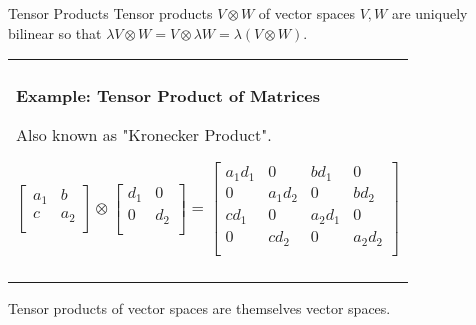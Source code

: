 \documentclass[11pt]{beamer}
\newenvironment{boxed2}
    {\begin{center}
    \begin{tabular}{|p{0.95\textwidth}|}
    \hline\\
    }
    { 
    \\\\\hline
    \end{tabular} 
    \end{center}
    }
\begin{document}
\begin{frame}{Tensor Products}
Tensor products $V\otimes W$ of vector spaces $V,W$ are uniquely bilinear so that $\lambda V\otimes W = V\otimes\lambda W = \lambda (V\otimes W)$. 
\begin{boxed2}
	
	\vspace{-.57cm}
	
	\textbf{Example: Tensor Product of Matrices}
	
	Also known as "Kronecker Product".
	
	
	\vspace{-.12cm}
	
	$$
	\begin{bmatrix}
		a_1&b\\
		c&a_2\\
	\end{bmatrix}
	\otimes 
	\begin{bmatrix}
		d_1&0\\
		0&d_2\\
	\end{bmatrix}
	=\begin{bmatrix}
		a_1d_1&0&bd_1&0\\
		0&a_1d_2&0&bd_2\\
		cd_1&0 &a_2d_1 &0\\
		0&cd_2&0&a_2d_2\\
	\end{bmatrix}
	$$
	
	\vspace{-.3cm}
	
\end{boxed2}

Tensor products of vector spaces are themselves vector spaces.
\end{frame}
\end{document}
